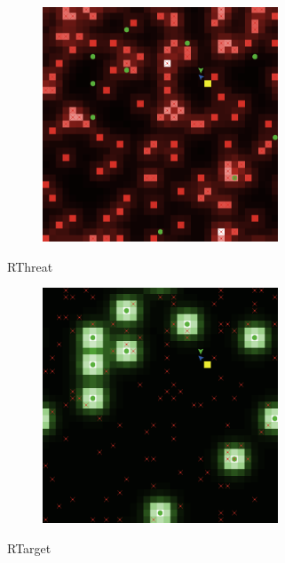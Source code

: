 \documentclass{beamer}
\begin{document}
\begin{frame}

  \begin{figure}
    \centering
    \includegraphics[width=7cm]{pheromones_hazard.png}
  \end{figure}

  \vfill

  \begin{center}
    RThreat
  \end{center}

\end{frame}

\begin{frame}

  \begin{figure}
    \centering
    \includegraphics[width=7cm]{pheromones_target.png}
  \end{figure}

  \vfill

  \begin{center}
    RTarget
  \end{center}

\end{frame}
\end{document}
